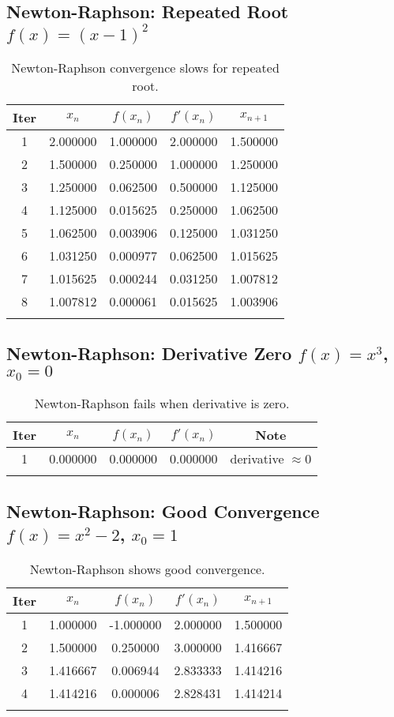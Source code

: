 \documentclass[12pt,a4paper]{article}
\begin{document}
\subsection*{Newton-Raphson: Repeated Root $f(x) = (x-1)^2$}

\begin{longtable}{|c|c|c|c|c|}
\hline
Iter & $x_n$ & $f(x_n)$ & $f'(x_n)$ & $x_{n+1}$ \\ \hline
1 & 2.000000 & 1.000000 & 2.000000 & 1.500000 \\
2 & 1.500000 & 0.250000 & 1.000000 & 1.250000 \\
3 & 1.250000 & 0.062500 & 0.500000 & 1.125000 \\
4 & 1.125000 & 0.015625 & 0.250000 & 1.062500 \\
5 & 1.062500 & 0.003906 & 0.125000 & 1.031250 \\
6 & 1.031250 & 0.000977 & 0.062500 & 1.015625 \\
7 & 1.015625 & 0.000244 & 0.031250 & 1.007812 \\
8 & 1.007812 & 0.000061 & 0.015625 & 1.003906 \\
\hline
\caption{Newton-Raphson convergence slows for repeated root.}
\label{tab:newton-repeated}
\end{longtable}

\subsection*{Newton-Raphson: Derivative Zero $f(x) = x^3$, $x_0 = 0$}

\begin{longtable}{|c|c|c|c|c|}
\hline
Iter & $x_n$ & $f(x_n)$ & $f'(x_n)$ & Note \\ \hline
1 & 0.000000 & 0.000000 & 0.000000 & derivative $\approx 0$ \\ 
\hline
\caption{Newton-Raphson fails when derivative is zero.}
\label{tab:newton-deriv-zero}
\end{longtable}

\subsection*{Newton-Raphson: Good Convergence $f(x) = x^2 - 2$, $x_0 = 1$}

\begin{longtable}{|c|c|c|c|c|}
\hline
Iter & $x_n$ & $f(x_n)$ & $f'(x_n)$ & $x_{n+1}$ \\ \hline
1 & 1.000000 & -1.000000 & 2.000000 & 1.500000 \\
2 & 1.500000 & 0.250000 & 3.000000 & 1.416667 \\
3 & 1.416667 & 0.006944 & 2.833333 & 1.414216 \\
4 & 1.414216 & 0.000006 & 2.828431 & 1.414214 \\
\hline
\caption{Newton-Raphson shows good convergence.}
\label{tab:newton-good}
\end{longtable}
\end{document}
